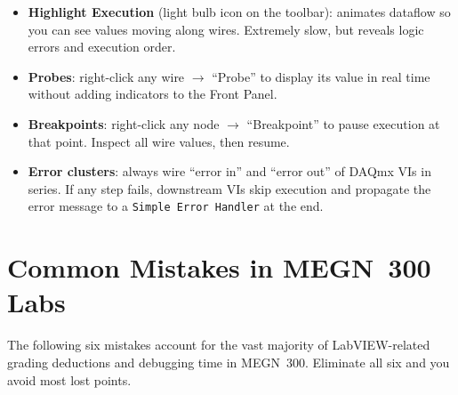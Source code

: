 \begin{tipbox}
\begin{itemize}[nosep,leftmargin=1.5em]
\item \textbf{Highlight Execution} (light bulb icon on the toolbar): animates dataflow so you can see values moving along wires. Extremely slow, but reveals logic errors and execution order.
\item \textbf{Probes}: right-click any wire $\to$ ``Probe'' to display its value in real time without adding indicators to the Front Panel.
\item \textbf{Breakpoints}: right-click any node $\to$ ``Breakpoint'' to pause execution at that point. Inspect all wire values, then resume.
\item \textbf{Error clusters}: always wire ``error in'' and ``error out'' of DAQmx VIs in series. If any step fails, downstream VIs skip execution and propagate the error message to a \texttt{Simple Error Handler} at the end.
\end{itemize}
\end{tipbox}

\section{Common Mistakes in MEGN~300 Labs}
\label{sec:lv_mistakes}

The following six mistakes account for the vast majority of LabVIEW-related grading deductions and debugging time in MEGN~300. Eliminate all six and you avoid most lost points.

